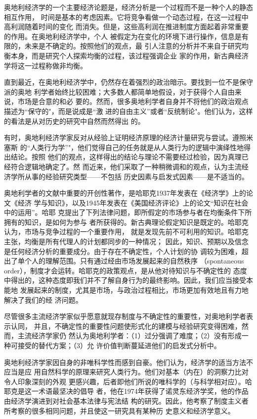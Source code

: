 奥地利经济学的一个主要经济论题是，经济分析是一个过程而不是一种个人的静态相互作用，
时间是基本的考虑因素。它将竞争看做一个动态过程，在这一过程中高利润随着时间的变化
而消失。但是，这些高利润在推进制度方面起着非常重要的作用。在奥地利经济学中，个人
被假定为在变化的环境下进行操作，信息是有限的，未来是不确定的。按照他们的观点，最
引人注意的分析并不来自于研究均衡本身，而是研究个人探索均衡的过程，该过程强调企业
家的作用，新古典经济学将这一过程称做非均衡。

直到最近，在奥地利经济学中，仍然存在着强烈的政治暗示。要找到一位不是保守派的奥地
利学者始终比较困难；大多数人都简单地假设，对于获得个人自由来说，市场是合意的和必
要的。然而，很多奥地利学者自身并不将他们的政治观点描述为“保守的"，而是说成是“激
进的自由主义”或者“反统制论"。他们认为，这样的看法是从对历史的研究中自然而然得出
的。

有时，奥地利经济学家反对从经验上证明经济原理的经济计量研究与尝试。遵照米塞斯
的“人类行为学”"，他们觉得自己的任务就是从人类行为的逻辑中演绎性地得出结论。按照
他们的观点，这样得出的结论与理论不需要经过检验，因为真理已经符合逻辑地确定了。然
而近来，他们采取了一种稍微调和的观点，认为主流经济学所从事的经验研究类型——不包括
历史因素与启发式因素——是不适当的。

奥地利学者的文献中重要的开创性著作，是哈耶克1937年发表在《经济学》上的论文《经济
学与知识》，以及1945年发表在《美国经济评论》上的论文“知识在社会中的运用”。哈耶
克提出了下列法律问题，即所假定的市场参与者在均衡条件下所拥有的知识，是如何为参与
者所获得的。新古典理论假定知识是既定的。哈耶克认为，市场与竞争过程的一个重要作用，
就是发现先前不可利用的知识。哈耶克主张，均衡是所有代理人的计划都同步的一种情况；
因此，知识、预期以及信念是任何经济分析的重要成分。由于存在不确定性，个人计划的协
调较为困难，超出了单个人的理解范围。只有通过经由市场发展起来的自然秩序
（spontaneous order），制度才会运转。哈耶克的政策观点，是从他对待知识与不确定性的
态度中得出的，这种态度即我们并不了解自身行为的最终影响。因此，我们应当接受本能地
发展起来的制度，尤其是市场，与政治过程相比，市场更加有效地且有力地解决了我们的经
济问题。

尽管很多主流经济学家似乎愿意就现存制度与不确定性的重要性，对奥地利学者表示认同，
并且，不确定性的重要性问题使形式化的建模与经验研究变得困难，然而，主流经济学家仍
然认为奥地利学者：（1）过分强调了难度；（2）没有形成一种可接受的替代方案；（3）允
许价值判断蔓延进他们的启发式分析中。


奥地利经济学家因自身的非唯科学性而感到自豪。他们认为，经济学的适当方法不应当是应
用自然科学的原理来研究人类行为。他们对基本（内在）的洞察力比对令人印象深刻的外观
更感兴趣，后者即他们所说的唯科学的（与科学相对应）。哈耶克是这一术语最坚决的倡导
者，他在1974年获得了诺灵东经济学奖，他的作品由经济学演进到对社会基本法律与宪法结
构的研究。因此，他考察了制度主义者所考察的很多相同问题，并且使这一研究具有某种历
史意义和经济学意义。

